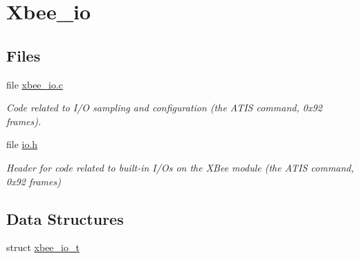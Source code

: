 \hypertarget{group__xbee__io}{}\section{Xbee\+\_\+io}
\label{group__xbee__io}
\subsection*{Files}
\begin{DoxyCompactItemize}
\item 
file \hyperlink{xbee__io_8c}{xbee\+\_\+io.\+c}
\begin{DoxyCompactList}\small\item\em Code related to I/O sampling and configuration (the A\+T\+IS command, 0x92 frames). \end{DoxyCompactList}\item 
file \hyperlink{io_8h}{io.\+h}
\begin{DoxyCompactList}\small\item\em Header for code related to built-\/in I/\+Os on the X\+Bee module (the A\+T\+IS command, 0x92 frames) \end{DoxyCompactList}\end{DoxyCompactItemize}
\subsection*{Data Structures}
\begin{DoxyCompactItemize}
\item 
struct \hyperlink{structxbee__io__t}{xbee\+\_\+io\+\_\+t}
\end{DoxyCompactItemize}
